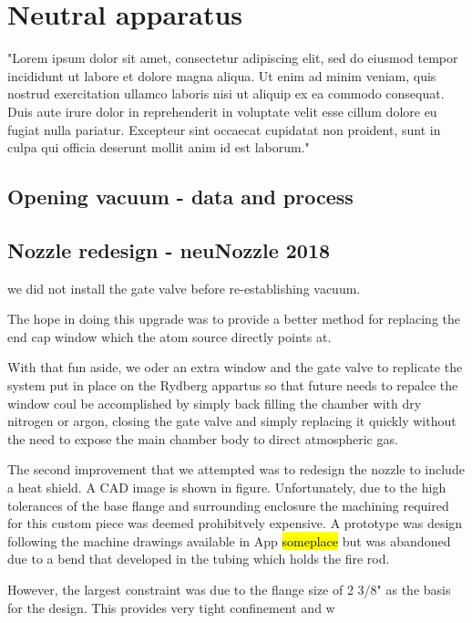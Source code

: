 \chapter{Neutral apparatus } \label{app:breakingVacuum}
"Lorem ipsum dolor sit amet, consectetur adipiscing elit, sed do eiusmod tempor incididunt ut labore et dolore magna aliqua. Ut enim ad minim veniam, quis nostrud exercitation ullamco laboris nisi ut aliquip ex ea commodo consequat. Duis aute irure dolor in reprehenderit in voluptate velit esse cillum dolore eu fugiat nulla pariatur. Excepteur sint occaecat cupidatat non proident, sunt in culpa qui officia deserunt mollit anim id est laborum."

\section{Opening vacuum - data and process}

\section{Nozzle redesign - neuNozzle 2018}


 we did not install the gate valve before re-establishing vacuum. 

The hope in doing this upgrade was to provide a better method for replacing the end cap window which the atom source directly points at. 

With that fun aside, we oder an extra window and the gate valve to replicate the system put in place on the Rydberg appartus so that future needs to repalce the window coul be accomplished by simply back filling the chamber with dry nitrogen or argon, closing the gate valve and simply replacing it quickly without the need to expose the main chamber body to direct atmospheric gas. 

The second improvement that we attempted was to redesign the nozzle to include a heat shield. A CAD image is shown in figure. Unfortunately, due to the high tolerances of the base flange and surrounding enclosure the machining required for this custom piece was deemed prohibitvely expensive. A prototype was design following the machine drawings available in App \hl{someplace} but was abandoned due to a bend that developed in the tubing which holds the fire rod. 

However, the largest constraint was due to the flange size of 2 3/8" as the basis for the design. This provides very tight confinement and w

